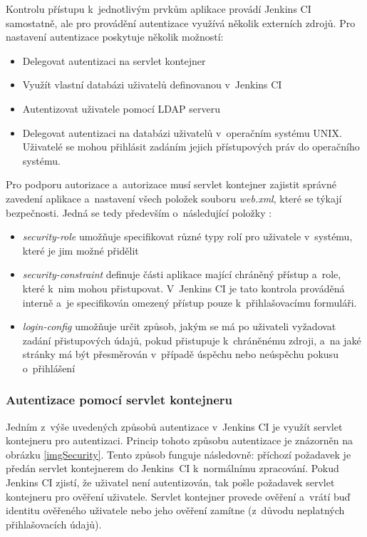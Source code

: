            Kontrolu přístupu k~jednotlivým prvkům aplikace provádí 
            Jenkins CI samostatně, ale pro provádění autentizace využívá několik externích zdrojů. Pro nastavení autentizace
            poskytuje několik možností:

            \begin{itemize}
                \item Delegovat autentizaci na servlet kontejner
                \item Využít vlastní databázi uživatelů definovanou v~Jenkins CI
                \item Autentizovat uživatele pomocí LDAP serveru
                \item Delegovat autentizaci na databázi uživatelů v~operačním systému UNIX. Uživatelé 
                    se mohou přihlásit zadáním jejich přístupových práv do operačního systému. 
            \end{itemize}
            
            Pro podporu autorizace a~autorizace musí servlet kontejner zajistit správné zavedení aplikace a~nastavení
            všech položek souboru \emph{web.xml}, které se týkají bezpečnosti. Jedná se tedy především
            o~následující položky \cite{webXml}:

            \begin{itemize}
                \item \emph{security-role} umožňuje specifikovat různé typy rolí pro uživatele v~systému,
                    které je jim možné přidělit
                \item \emph{security-constraint} definuje části aplikace mající chráněný přístup a~role, které k~nim
                    mohou přistupovat. V~Jenkins CI je tato kontrola prováděná interně a~je specifikován
                    omezený přístup pouze k~přihlašovacímu formuláři.
                \item \emph{login-config} umožňuje určit způsob, jakým se má po uživateli vyžadovat zadání přistupových
                    údajů, pokud přistupuje k~chráněnému zdroji, a~na jaké stránky má být přesměrován v~případě úspěchu
                    nebo neúspěchu pokusu o~přihlášení
            \end{itemize}
            
    
            \subsubsection{Autentizace pomocí servlet kontejneru}
                Jedním z~výše uvedených způsobů autentizace v~Jenkins CI je využít servlet kontejneru pro autentizaci.
                Princip tohoto způsobu autentizace je znázorněn na obrázku \ref{imgSecurity}. 
                Tento způsob funguje následovně: příchozí 
                požadavek je předán servlet kontejnerem do Jenkins~CI k~normálnímu zpracování. 
                Pokud Jenkins CI zjistí, že uživatel
                není autentizován, tak pošle požadavek servlet kontejneru pro ověření uživatele. Servlet
                kontejner provede ověření a~vrátí buď identitu ověřeného uživatele nebo jeho ověření zamítne (z~důvodu
                neplatných přihlašovacích údajů).
                

